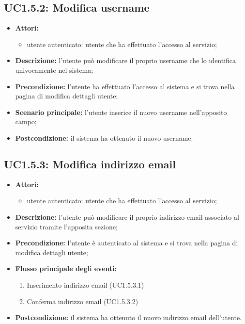 \subsection{UC1.5.2: Modifica username}
\begin{itemize}
	\item \textbf{Attori:}
	\begin{itemize}
		\item utente autenticato: utente che ha effettuato l'accesso al servizio;
	\end{itemize}
	\item \textbf{Descrizione:} l'utente può modificare il proprio username che lo identifica univocamente nel sistema;
	\item \textbf{Precondizione:} l'utente ha effettuato l'accesso al sistema e si trova nella pagina di modifica dettagli utente;
	\item \textbf{Scenario principale:} l'utente inserice il nuovo username nell'apposito campo;
	\item \textbf{Postcondizione:} il sistema ha ottenuto il nuovo username.
\end{itemize}

\subsection{UC1.5.3: Modifica indirizzo email}
\begin{itemize}
	\item \textbf{Attori:}
	\begin{itemize}
		\item utente autenticato: utente che ha effettuato l'accesso al servizio;
	\end{itemize}
	\item \textbf{Descrizione:} l'utente può modificare il proprio indirizzo email associato al servizio tramite l'apposita sezione;
	\item \textbf{Precondizione:} l'utente è autenticato al sistema e si trova nella pagina di modifica dettagli utente;
	\item \textbf{Flusso principale degli eventi:}
	\begin{enumerate}
		\item Inserimento indirizzo email (UC1.5.3.1)
		\item Conferma indirizzo email (UC1.5.3.2)
	\end{enumerate}
	\item \textbf{Postcondizione:} il sistema ha ottenuto il nuovo indirizzo email dell'utente.
\end{itemize}

